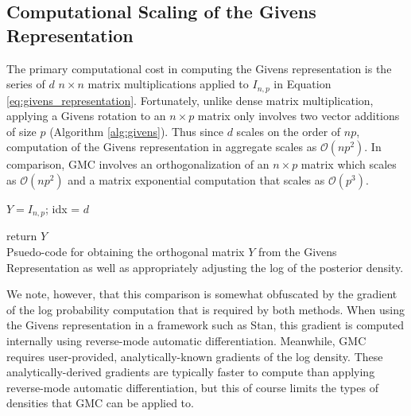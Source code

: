 \documentclass[ba]{imsart}
\numberwithin{equation}{section}
\theoremstyle{plain}
\begin{document}
\subsection{Computational Scaling of the Givens Representation}\label{scaling}
The primary computational cost in computing the Givens representation is the series of $d$ $n \times n$ matrix multiplications applied to $I_{n,p}$ in Equation \ref{eq:givens_representation}. Fortunately, unlike dense matrix multiplication, applying a Givens rotation to an $n \times p$ matrix only involves two vector additions of size $p$ (Algorithm \ref{alg:givens}). Thus since $d$ scales on the order of $np$, computation of the Givens representation in aggregate scales as $\mathcal{O}(np^2)$. In comparison, GMC involves an orthogonalization of an $n \times p$ matrix which scales as $\mathcal{O}(np^2)$ and a matrix exponential computation that scales as $\mathcal{O}(p^3)$.

\begin{algorithm}[h]
\SetAlgoLined
\KwIn{$\theta$}
$Y = I_{n,p}$;
 idx = $d$
 
return $Y$
\\
\caption{Psuedo-code for obtaining the orthogonal matrix $Y$ from the Givens Representation as well as appropriately adjusting the log of the posterior density.}
 \label{alg:givens}
\end{algorithm}

\noindent We note, however, that this comparison is somewhat obfuscated by the gradient of the log probability computation that is required by both methods. When using the Givens representation in a framework such as Stan, this gradient is computed internally using reverse-mode automatic differentiation. Meanwhile, GMC requires user-provided, analytically-known gradients of the log density. These analytically-derived gradients are typically faster to compute than applying reverse-mode automatic differentiation, but this of course limits the types of densities that GMC can be applied to.
\end{document}
